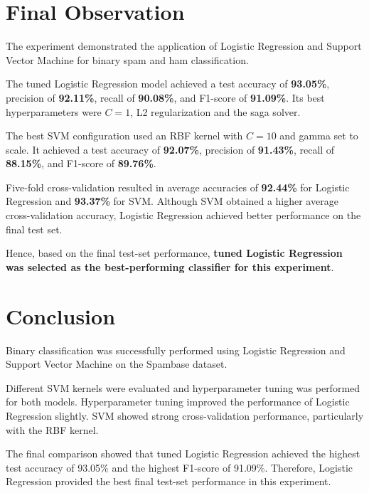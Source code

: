 \documentclass[12pt,a4paper]{article}
\begin{document}
\section{Final Observation}

The experiment demonstrated the application of Logistic Regression and
Support Vector Machine for binary spam and ham classification.

The tuned Logistic Regression model achieved a test accuracy of
\textbf{93.05\%}, precision of \textbf{92.11\%}, recall of
\textbf{90.08\%}, and F1-score of \textbf{91.09\%}. Its best
hyperparameters were $C=1$, L2 regularization and the saga solver.

The best SVM configuration used an RBF kernel with $C=10$ and gamma
set to scale. It achieved a test accuracy of \textbf{92.07\%},
precision of \textbf{91.43\%}, recall of \textbf{88.15\%}, and
F1-score of \textbf{89.76\%}.

Five-fold cross-validation resulted in average accuracies of
\textbf{92.44\%} for Logistic Regression and \textbf{93.37\%} for
SVM. Although SVM obtained a higher average cross-validation accuracy,
Logistic Regression achieved better performance on the final test set.

Hence, based on the final test-set performance, \textbf{tuned Logistic
Regression was selected as the best-performing classifier for this
experiment}.


\section{Conclusion}

Binary classification was successfully performed using Logistic
Regression and Support Vector Machine on the Spambase dataset.

Different SVM kernels were evaluated and hyperparameter tuning was
performed for both models. Hyperparameter tuning improved the
performance of Logistic Regression slightly. SVM showed strong
cross-validation performance, particularly with the RBF kernel.

The final comparison showed that tuned Logistic Regression achieved
the highest test accuracy of 93.05\% and the highest F1-score of
91.09\%. Therefore, Logistic Regression provided the best final
test-set performance in this experiment.
\end{document}
